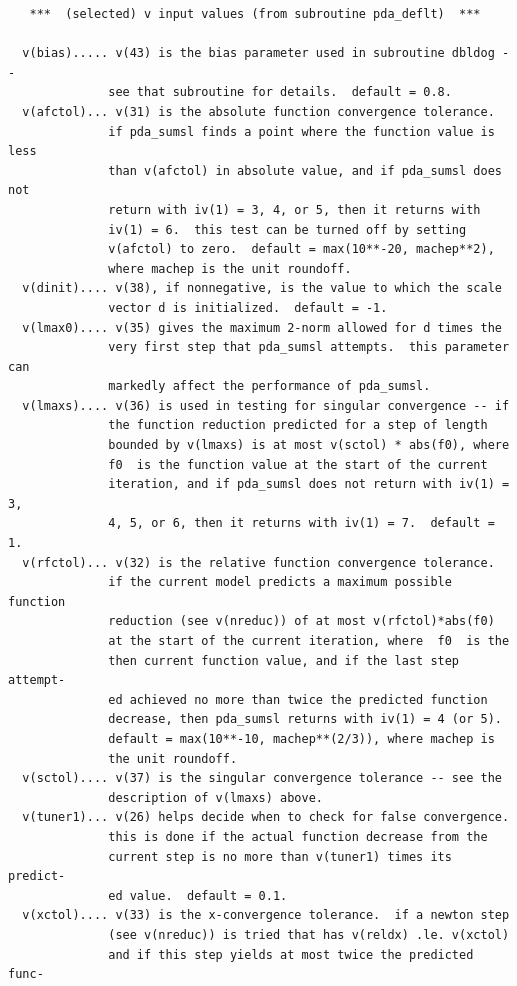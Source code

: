 \documentclass[11pt,twoside]{article}
\begin{document}
\begin{verbatim}
   ***  (selected) v input values (from subroutine pda_deflt)  ***
 
  v(bias)..... v(43) is the bias parameter used in subroutine dbldog --
              see that subroutine for details.  default = 0.8.
  v(afctol)... v(31) is the absolute function convergence tolerance.
              if pda_sumsl finds a point where the function value is less
              than v(afctol) in absolute value, and if pda_sumsl does not
              return with iv(1) = 3, 4, or 5, then it returns with
              iv(1) = 6.  this test can be turned off by setting
              v(afctol) to zero.  default = max(10**-20, machep**2),
              where machep is the unit roundoff.
  v(dinit).... v(38), if nonnegative, is the value to which the scale
              vector d is initialized.  default = -1.
  v(lmax0).... v(35) gives the maximum 2-norm allowed for d times the
              very first step that pda_sumsl attempts.  this parameter can
              markedly affect the performance of pda_sumsl.
  v(lmaxs).... v(36) is used in testing for singular convergence -- if
              the function reduction predicted for a step of length
              bounded by v(lmaxs) is at most v(sctol) * abs(f0), where
              f0  is the function value at the start of the current
              iteration, and if pda_sumsl does not return with iv(1) = 3,
              4, 5, or 6, then it returns with iv(1) = 7.  default = 1.
  v(rfctol)... v(32) is the relative function convergence tolerance.
              if the current model predicts a maximum possible function
              reduction (see v(nreduc)) of at most v(rfctol)*abs(f0)
              at the start of the current iteration, where  f0  is the
              then current function value, and if the last step attempt-
              ed achieved no more than twice the predicted function
              decrease, then pda_sumsl returns with iv(1) = 4 (or 5).
              default = max(10**-10, machep**(2/3)), where machep is
              the unit roundoff.
  v(sctol).... v(37) is the singular convergence tolerance -- see the
              description of v(lmaxs) above.
  v(tuner1)... v(26) helps decide when to check for false convergence.
              this is done if the actual function decrease from the
              current step is no more than v(tuner1) times its predict-
              ed value.  default = 0.1.
  v(xctol).... v(33) is the x-convergence tolerance.  if a newton step
              (see v(nreduc)) is tried that has v(reldx) .le. v(xctol)
              and if this step yields at most twice the predicted func-

\end{verbatim}
\end{document}
